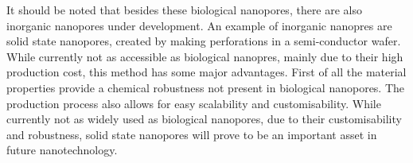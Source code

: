 It should be noted that besides these biological nanopores, there are also inorganic
nanopores under development. An example of inorganic nanopres are solid state nanopores,
created by making perforations in a semi-conductor wafer. While currently not as
accessible as biological nanopres, mainly due to their high production cost, this method
has some major advantages. First of all the material properties provide a chemical
robustness not
present in biological nanopores. The production process also allows for easy scalability
and customisability. While currently not as widely used as biological nanopores, due
to their customisability and robustness, solid state nanopores will prove to be an
important asset in future nanotechnology.
